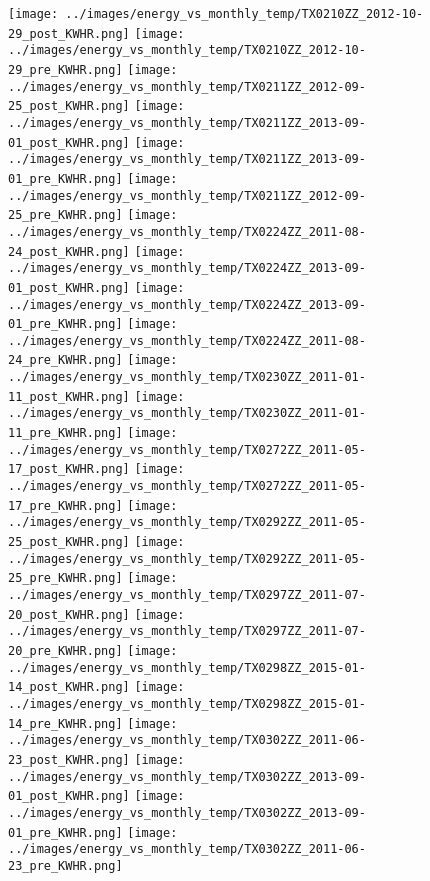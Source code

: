 \clearpage
\begin{figure}
\centering
\texttt{[image: ../images/energy\_vs\_monthly\_temp/TX0210ZZ\_2012-10-29\_post\_KWHR.png]}
\texttt{[image: ../images/energy\_vs\_monthly\_temp/TX0210ZZ\_2012-10-29\_pre\_KWHR.png]}
\texttt{[image: ../images/energy\_vs\_monthly\_temp/TX0211ZZ\_2012-09-25\_post\_KWHR.png]}
\texttt{[image: ../images/energy\_vs\_monthly\_temp/TX0211ZZ\_2013-09-01\_post\_KWHR.png]}
\texttt{[image: ../images/energy\_vs\_monthly\_temp/TX0211ZZ\_2013-09-01\_pre\_KWHR.png]}
\texttt{[image: ../images/energy\_vs\_monthly\_temp/TX0211ZZ\_2012-09-25\_pre\_KWHR.png]}
\texttt{[image: ../images/energy\_vs\_monthly\_temp/TX0224ZZ\_2011-08-24\_post\_KWHR.png]}
\texttt{[image: ../images/energy\_vs\_monthly\_temp/TX0224ZZ\_2013-09-01\_post\_KWHR.png]}
\texttt{[image: ../images/energy\_vs\_monthly\_temp/TX0224ZZ\_2013-09-01\_pre\_KWHR.png]}
\texttt{[image: ../images/energy\_vs\_monthly\_temp/TX0224ZZ\_2011-08-24\_pre\_KWHR.png]}
\texttt{[image: ../images/energy\_vs\_monthly\_temp/TX0230ZZ\_2011-01-11\_post\_KWHR.png]}
\texttt{[image: ../images/energy\_vs\_monthly\_temp/TX0230ZZ\_2011-01-11\_pre\_KWHR.png]}
\texttt{[image: ../images/energy\_vs\_monthly\_temp/TX0272ZZ\_2011-05-17\_post\_KWHR.png]}
\texttt{[image: ../images/energy\_vs\_monthly\_temp/TX0272ZZ\_2011-05-17\_pre\_KWHR.png]}
\texttt{[image: ../images/energy\_vs\_monthly\_temp/TX0292ZZ\_2011-05-25\_post\_KWHR.png]}
\texttt{[image: ../images/energy\_vs\_monthly\_temp/TX0292ZZ\_2011-05-25\_pre\_KWHR.png]}
\texttt{[image: ../images/energy\_vs\_monthly\_temp/TX0297ZZ\_2011-07-20\_post\_KWHR.png]}
\texttt{[image: ../images/energy\_vs\_monthly\_temp/TX0297ZZ\_2011-07-20\_pre\_KWHR.png]}
\texttt{[image: ../images/energy\_vs\_monthly\_temp/TX0298ZZ\_2015-01-14\_post\_KWHR.png]}
\texttt{[image: ../images/energy\_vs\_monthly\_temp/TX0298ZZ\_2015-01-14\_pre\_KWHR.png]}
\texttt{[image: ../images/energy\_vs\_monthly\_temp/TX0302ZZ\_2011-06-23\_post\_KWHR.png]}
\texttt{[image: ../images/energy\_vs\_monthly\_temp/TX0302ZZ\_2013-09-01\_post\_KWHR.png]}
\texttt{[image: ../images/energy\_vs\_monthly\_temp/TX0302ZZ\_2013-09-01\_pre\_KWHR.png]}
\texttt{[image: ../images/energy\_vs\_monthly\_temp/TX0302ZZ\_2011-06-23\_pre\_KWHR.png]}
\end{figure}
